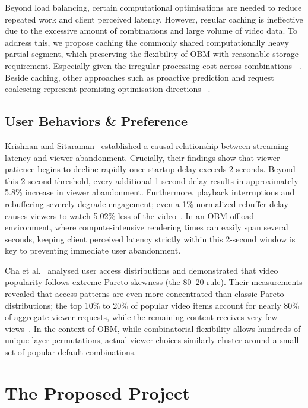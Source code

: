 \documentclass[11pt,a4paper]{article}
\begin{document}
Beyond load balancing, certain computational optimisations are needed to reduce repeated work and client perceived latency.
However, regular caching is ineffective due to the excessive amount of combinations and large volume of video data.
To address this, we propose caching the commonly shared computationally heavy partial segment,
which preserving the flexibility of OBM with reasonable storage requirement.
Especially given the irregular processing cost across combinations ~\cite{11217518}.
Beside caching, other approaches such as proactive prediction and request coalescing represent promising optimisation directions ~\cite{10.1145/3793853.3795762}.

\subsection{User Behaviors \& Preference}


Krishnan and Sitaraman~\cite{10.1145/2398776.2398799} established a causal relationship between streaming latency and viewer abandonment. 
Crucially, their findings show that viewer patience begins to decline rapidly once startup delay exceeds 2 seconds. 
Beyond this 2-second threshold, every additional 1-second delay results in approximately 5.8\% increase in viewer abandonment. 
Furthermore, playback interruptions and rebuffering severely degrade engagement; 
even a 1\% normalized rebuffer delay causes viewers to watch 5.02\% less of the video~\cite{10.1145/2398776.2398799}. 
In an OBM offload environment, where compute-intensive rendering times can easily span several seconds,
keeping client perceived latency strictly within this 2-second window is key to preventing immediate user abandonment.

Cha et al.~\cite{inproceedings} analysed user access distributions and demonstrated that video popularity follows extreme Pareto skewness (the 80--20 rule). 
Their measurements revealed that access patterns are even more concentrated than classic Pareto distributions;
the top 10\% to 20\% of popular video items account for nearly 80\% of aggregate viewer requests,
while the remaining content receives very few views~\cite{inproceedings}. 
In the context of OBM, while combinatorial flexibility allows hundreds of unique layer permutations,
actual viewer choices similarly cluster around a small set of popular default combinations.

\section{The Proposed Project}
\end{document}
